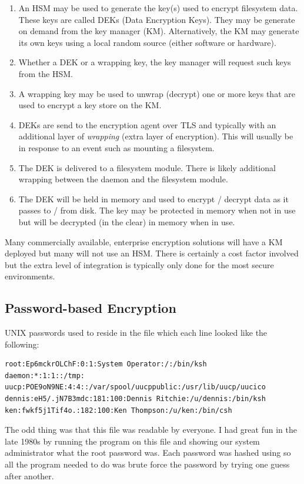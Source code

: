 \begin{enumerate}
	\item An HSM may be used to generate the key(s) used to encrypt filesystem data. These keys are called DEKs (Data
		Encryption Keys). They may be generate on demand from the key manager (KM). Alternatively, the KM may 
		generate its own keys using a local random source (either software or hardware). 
	\item Whether a DEK or a wrapping key, the key manager will request such keys from the HSM.
	\item A wrapping key may be used to unwrap (decrypt) one or more keys that are used to encrypt a key store on the KM.
	\item DEKs are send to the encryption agent over TLS and typically with an additional layer of \textit{wrapping} (extra
		layer of encryption). This will usually be in response to an event such as mounting a filesystem.
	\item The DEK is delivered to a filesystem module. There is likely additional wrapping between the daemon and
		the filesystem module.
	\item The DEK will be held in memory and used to encrypt / decrypt data as it passes to / from disk. The key
		may be protected in memory when not in use but will be decrypted (in the clear) in memory when in use.
\end{enumerate}

\noindent
Many commercially available, enterprise encryption solutions will have a KM deployed but many will not use an HSM. There is certainly a cost factor involved but the extra level of integration is typically only done for the most secure environments.

\subsection{Password-based Encryption}

UNIX passwords used to reside in the file  which each line looked like the following:

\begin{lstlisting}
root:Ep6mckrOLChF:0:1:System Operator:/:/bin/ksh 
daemon:*:1:1::/tmp: 
uucp:POE9oN9NE:4:4::/var/spool/uucppublic:/usr/lib/uucp/uucico 
dennis:eH5/.jN7B3mdc:181:100:Dennis Ritchie:/u/dennis:/bin/ksh 
ken:fwkf5j1Tif4o.:182:100:Ken Thompson:/u/ken:/bin/csh
\end{lstlisting}

\noindent
The odd thing was that this file was readable by everyone. I had great fun in the late 1980s by running the  program on this file and showing our system administrator what the root password was. Each password was hashed using  so all the  program needed to do was brute force the password by trying one guess after another.

